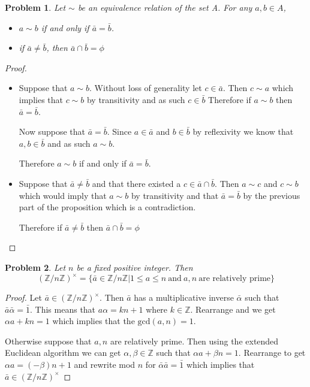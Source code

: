 \documentclass[10pt]{article}
\newcommand{\sk}{\vskip 10mm}
\newcommand{\bb}[1]{\mathbb{#1}}
\theoremstyle{plain}
\newtheorem{problem}{Problem}
\theoremstyle{remark}
\begin{document}
\sk

\begin{problem}
  Let $\sim$ be an equivalence relation of the set A. For any $a,b\in A$,
  \begin{itemize}
  \item[a)] $a\sim b$ if and only if $\bar{a}=\bar{b}$.
  \item[b)] if $\bar{a}\neq \bar{b}$, then $\bar{a}\cap\bar{b}=\phi$
  \end{itemize}
\end{problem}

\begin{proof}\ \\
  \begin{itemize}
  \item[a)] Suppose that $a\sim b$. Without loss of generality let $c\in\bar{a}$. Then
    $c\sim a$ which implies that $c\sim b$ by transitivity and as such $c\in\bar{b}$
    Therefore if $a\sim b$ then $\bar{a}=\bar{b}$.

    Now suppose that $\bar{a}=\bar{b}$. Since $a\in\bar{a}$ and $b\in\bar{b}$ by
    reflexivity we know that $a,b\in\bar{b}$ and as such $a\sim b$.

    Therefore $a\sim b$ if and only if $\bar{a}=\bar{b}$.
  \item[b)] Suppose that $\bar{a}\neq\bar{b}$ and that there existed a
    $c\in \bar{a}\cap\bar{b}$. Then $a\sim c$ and $c\sim b$ which would imply that
    $a\sim b$ by transitivity and that $\bar{a}=\bar{b}$ by the previous part of the
    proposition which is a contradiction.

    Therefore if $\bar{a}\neq\bar{b}$ then $\bar{a}\cap\bar{b}=\phi$
  \end{itemize}
\end{proof}

\sk

\begin{problem}
  Let $n$ be a fixed positive integer. Then
  \[ (\bb{Z}/n\bb{Z})^\times = \{ \bar{a}\in \bb{Z}/n\bb{Z}|1\leq a\leq n\ \text{and}\ a,n\ \text{are relatively prime}\}\]
\end{problem}

\begin{proof}
  Let $\bar{a}\in(\bb{Z}/n\bb{Z})^\times$. Then $\bar{a}$ has a multiplicative inverse
  $\bar{\alpha}$ such that $\bar{a}\bar{\alpha}=\bar{1}$. This means that
  $a\alpha=kn+1$ where $k\in\bb{Z}$. Rearrange and we get
  $\alpha a+kn=1$ which implies that the $\mathrm{gcd}(a,n)=1$.

  Otherwise suppose that $a,n$ are relatively prime. Then using the extended
  Euclidean algorithm we can get $\alpha,\beta\in\bb{Z}$ such that $\alpha a+\beta n = 1$.
  Rearrange to get $\alpha a = (-\beta)n +1$ and rewrite mod $n$ for
  $\bar{\alpha}\bar{a}=\bar{1}$ which implies that $\bar{a}\in(\bb{Z}/n\bb{Z})^\times$
\end{proof}

\end{document}
